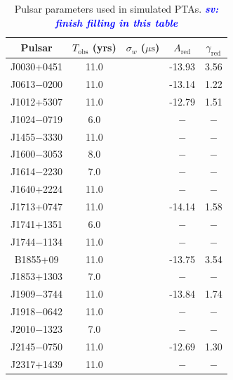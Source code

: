 \documentclass[twocolumn,aps,prd,superscriptaddress]{revtex4-1}
\newcommand{\sv}[1]{\textcolor{blue}{\it{\textbf{sv: #1}}} }
\begin{document}
\begin{table}[tb]
	\setlength{\tabcolsep}{5pt}
	\caption{Pulsar parameters used in simulated PTAs. \sv{finish filling in this table}}
	\begin{center}
	\begin{tabular}{ccccc}
		\hline\hline
    		Pulsar	& $T_\mathrm{obs}$ (yrs) & $\sigma_w$ ($\mu\mathrm{s}$) & $A_\mathrm{red}$ & $\gamma_\mathrm{red}$ \\
		\hline
		J0030+0451 & 11.0 & & -13.93 & 3.56 \\
		J0613$-$0200 & 11.0 &  & -13.14 & 1.22 \\
		J1012+5307 & 11.0 &  & -12.79 & 1.51 \\
		J1024$-$0719 & 6.0 & & $-$ & $-$ \\
		J1455$-$3330 & 11.0 & & $-$ & $-$ \\
		J1600$-$3053 & 8.0 & & $-$ & $-$ \\
		J1614$-$2230 & 7.0 & & $-$ & $-$ \\
		J1640+2224 & 11.0 & & $-$ & $-$ \\
		J1713+0747 & 11.0 & & -14.14 & 1.58 \\
		J1741+1351 & 6.0 & & $-$ & $-$ \\
		J1744$-$1134 & 11.0 & & $-$ & $-$ \\
		B1855+09 & 11.0 & & -13.75 & 3.54 \\
		J1853+1303 & 7.0 & & $-$ & $-$ \\
		J1909$-$3744 & 11.0 &  & -13.84 & 1.74  \\
		J1918$-$0642 & 11.0 & & $-$ & $-$ \\
		J2010$-$1323 & 7.0 & & $-$ & $-$ \\
		J2145$-$0750 & 11.0 &  & -12.69 & 1.30 \\
		J2317+1439 & 11.0 & & $-$ & $-$ \\
    		\hline\hline
	\end{tabular}
	\end{center}
	\label{tab:sim}
\end{table}
\end{document}
